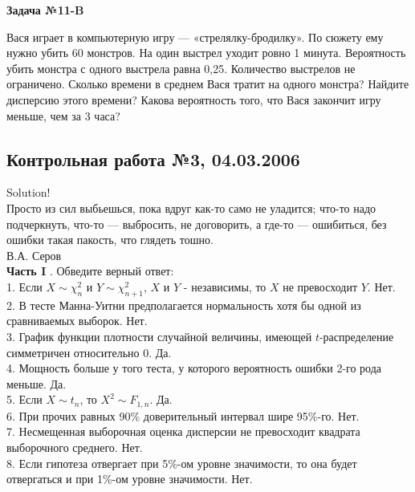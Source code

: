 \documentclass[12pt, a4paper]{article}\usepackage[]{graphicx}\usepackage[]{color}
\begin{document}
	{\bf Задача №}{\bf 11}{\bf -}{\bf B}

	Вася играет в компьютерную игру — «стрелялку-бродилку». По сюжету ему нужно убить 60 монстров. На один выстрел уходит ровно 1 минута. Вероятность убить монстра с одного выстрела равна 0,25. Количество выстрелов не ограничено. Сколько времени в среднем Вася тратит на одного монстра? Найдите дисперсию этого времени? Какова вероятность того, что Вася закончит игру меньше, чем за 3 часа?

	\subsection{Контрольная работа №3, 04.03.2006}


	Solution! \\

	Просто из сил выбьешься, пока вдруг как-то само не уладится;
	что-то надо подчеркнуть, что-то — выбросить, не договорить, а
	где-то — ошибиться, без ошибки такая пакость, что глядеть тошно. \\
	В.А. Серов \\


	{\bf Часть I }. Обведите верный ответ: \\

	1. Если $X\sim \chi_{n}^{2}$ и $Y\sim \chi_{n+1}^{2}$, $X$ и $Y$ -
	независимы, то  $X$ не превосходит $Y$. Нет.  \\

	2. В тесте Манна-Уитни предполагается нормальность хотя бы одной
	из сравниваемых выборок. Нет. \\

	3. График функции плотности случайной величины, имеющей
	$t$-распределение симметричен относительно 0. Да.  \\
	4. Мощность больше у того теста, у которого вероятность ошибки
	2-го рода меньше. Да.  \\

	5. Если $X\sim t_{n}$, то $X^{2}\sim F_{1,n}$. Да.\\
	6. При прочих равных 90\% доверительный интервал шире 95\%-го.  Нет. \\
	7. Несмещенная выборочная оценка дисперсии не превосходит квадрата
	выборочного среднего. Нет. \\

	8. Если гипотеза отвергает при 5\%-ом уровне значимости, то она
	будет отвергаться и при 1\%-ом уровне значимости. Нет. \\
\end{document}
